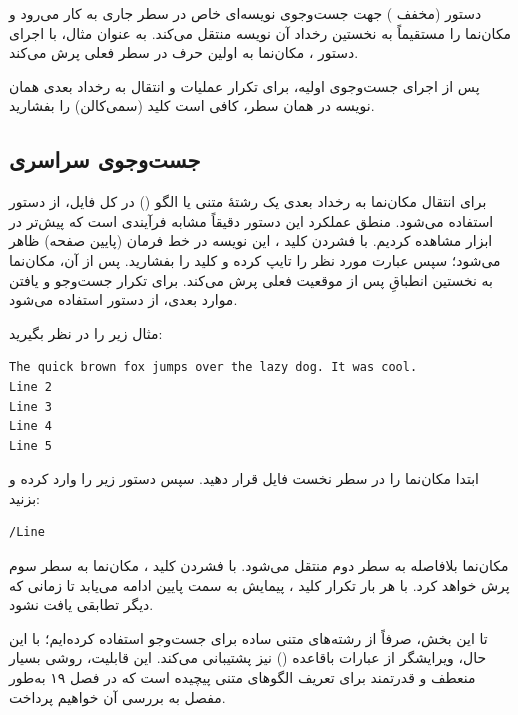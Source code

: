 دستور  (مخفف ) جهت جست‌وجوی نویسه‌ای خاص در سطر جاری به کار می‌رود و مکان‌نما را مستقیماً به نخستین رخداد آن نویسه منتقل می‌کند. به عنوان مثال، با اجرای دستور ، مکان‌نما به اولین حرف  در سطر فعلی پرش می‌کند.

پس از اجرای جست‌وجوی اولیه، برای تکرار عملیات و انتقال به رخداد بعدی همان نویسه در همان سطر، کافی است کلید \cmd{;} (سمی‌کالن) را بفشارید.

\subsection{جست‌وجوی سراسری}

برای انتقال مکان‌نما به رخداد بعدی یک رشتهٔ متنی یا الگو () در کل فایل، از دستور \cmd{/} استفاده می‌شود. منطق عملکرد این دستور دقیقاً مشابه فرآیندی است که پیش‌تر در ابزار  مشاهده کردیم. با فشردن کلید \cmd{/}، این نویسه در خط فرمان (پایین صفحه) ظاهر می‌شود؛ سپس عبارت مورد نظر را تایپ کرده و کلید  را بفشارید. پس از آن، مکان‌نما به نخستین انطباقِ پس از موقعیت فعلی پرش می‌کند. برای تکرار جست‌وجو و یافتن موارد بعدی، از دستور  استفاده می‌شود.

مثال زیر را در نظر بگیرید:

\begin{latin}
\begin{lstlisting}
The quick brown fox jumps over the lazy dog. It was cool.
Line 2
Line 3
Line 4
Line 5
\end{lstlisting}
\end{latin}

ابتدا مکان‌نما را در سطر نخست فایل قرار دهید. سپس دستور زیر را وارد کرده و  بزنید:

\begin{latin}
\begin{lstlisting}
/Line
\end{lstlisting}
\end{latin}

مکان‌نما بلافاصله به سطر دوم منتقل می‌شود. با فشردن کلید ، مکان‌نما به سطر سوم پرش خواهد کرد. با هر بار تکرار کلید ، پیمایش به سمت پایین ادامه می‌یابد تا زمانی که دیگر تطابقی یافت نشود.

تا این بخش، صرفاً از رشته‌های متنی ساده برای جست‌وجو استفاده کرده‌ایم؛ با این حال، ویرایشگر  از عبارات باقاعده () نیز پشتیبانی می‌کند. این قابلیت، روشی بسیار منعطف و قدرتمند برای تعریف الگوهای متنی پیچیده است که در فصل ۱۹ به‌طور مفصل به بررسی آن خواهیم پرداخت.

